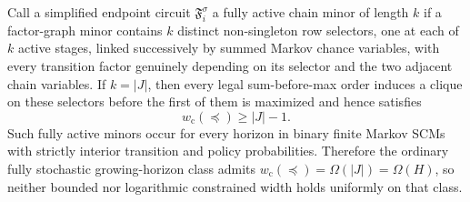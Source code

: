 Call a simplified endpoint circuit \(\mathfrak F_i^\sigma\) a fully active chain minor of length \(k\) if a factor-graph minor contains \(k\) distinct non-singleton row selectors, one at each of \(k\) active stages, linked successively by summed Markov chance variables, with every transition factor genuinely depending on its selector and the two adjacent chain variables.  If \(k=|J|\), then every legal sum-before-max order induces a clique on these selectors before the first of them is maximized and hence satisfies
\[
 w_{\mathrm c}(\preceq)\ge |J|-1.
\]
Such fully active minors occur for every horizon in binary finite Markov SCMs with strictly interior transition and policy probabilities.  Therefore the ordinary fully stochastic growing-horizon class admits \(w_{\mathrm c}(\preceq)=\Omega(|J|)=\Omega(H)\), so neither bounded nor logarithmic constrained width holds uniformly on that class.